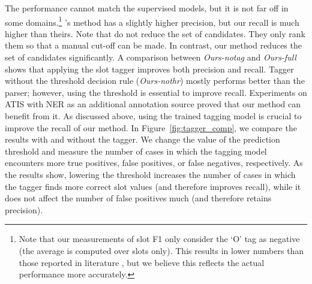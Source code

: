 The performance cannot match the supervised models, but it is not far off in some domains.\footnote{Note that our measurements of slot F1 only consider the `O' tag as negative (the average is computed over slots only). This results in lower numbers than those reported in literature \cite{goo_slot-gated_2018}, but we believe this reflects the actual performance more accurately.}
\citet{chen2014leveraging}'s method has a slightly higher precision, but our recall is much higher than theirs.
Note that \citet{chen2014leveraging} do not reduce the set of candidates.
They only rank them so that a manual cut-off can be made.
In contrast, our method reduces the set of candidates significantly.
A comparison between \textit{Ours-notag} and \textit{Ours-full} shows that applying the slot tagger improves both precision and recall.
Tagger without the threshold decision rule (\textit{Ours-nothr}) mostly performs better than the parser; however, using the threshold is essential to improve recall.
Experiments on ATIS with NER as an additional annotation source proved that our method can benefit from it.
As discussed above, using the trained tagging model is crucial to improve the recall of our method. In Figure~\ref{fig:tagger_comp}, we compare the results with and without the tagger. We change the value of the prediction threshold and measure the number of cases in which the tagging model encounters more true positives, false positives, or false negatives, respectively. As the results show, lowering the threshold increases the number of cases in which the tagger finds more correct slot values (and therefore improves recall), while it does not affect the number of false positives much (and therefore retains precision).
